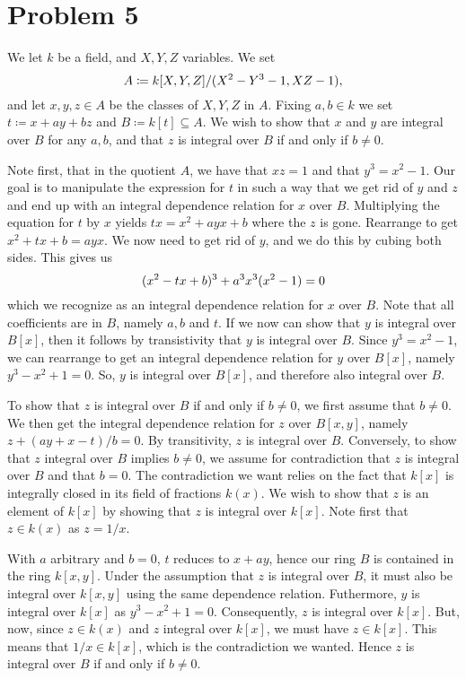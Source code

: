 \documentclass{article}
\begin{document}
\section*{Problem 5}
We let $k$ be a field, and $X, Y, Z$ variables. We set
\begin{equation}
    \notag
    A \coloneqq k[X, Y, Z] / (X^2- Y^3 - 1, XZ - 1), 
\end{equation}
and let $x, y, z \in A$ be the classes of $X, Y, Z$ in $A$. Fixing $a, b \in k$
we set $t \coloneqq x + ay + bz$ and $B \coloneqq k[t] \subseteq A$. We wish to
show that $x$ and $y$ are integral over $B$ for any $a, b$, and that $z$ is
integral over $B$ if and only if $b \neq 0$.

Note first, that in the quotient $A$, we have that $xz = 1$ and that $y^3 = x^2
- 1$. Our goal is to manipulate the expression for $t$ in such a way that we
get rid of $y$ and $z$ and end up with an integral dependence relation for $x$
over $B$. Multiplying the equation for $t$ by $x$ yields $tx = x^2 + ayx + b$
where the $z$ is gone. Rearrange to get $x^2 + tx + b = ayx$. We now need to
get rid of $y$, and we do this by cubing both sides. This gives us
\begin{equation}
    \notag
    (x^2 - tx + b)^3 + a^3x^3(x^2 - 1) = 0
\end{equation}
which we recognize as an integral dependence relation for $x$ over $B$. Note
that all coefficients are in $B$, namely $a, b$ and $t$. If we now can show
that $y$ is integral over $B[x]$, then it follows by transistivity that $y$ is
integral over $B$. Since $y^3 = x^2 - 1$, we can rearrange to get an integral
dependence relation for $y$ over $B[x]$, namely $y^3 - x^2 + 1 = 0$. So, $y$ is
integral over $B[x]$, and therefore also integral over $B$.

To show that $z$ is integral over $B$ if and only if $b \neq 0$, we first
assume that $b\neq 0$. We then get the integral dependence relation for $z$
over $B[x, y]$, namely $z + (a y + x - t) / b = 0$. By transitivity, $z$ is
integral over $B$. Conversely, to show that $z$ integral over $B$ implies $b
\neq 0$, we assume for contradiction that $z$ is integral over $B$ and that $b
= 0$. The contradiction we want relies on the fact that $k[x]$ is integrally
closed in its field of fractions $k(x)$. We wish to show that $z$ is an element
of $k[x]$ by showing that $z$ is integral over $k[x]$. Note first that $z \in
k(x)$ as $z = 1 / x$. 

With $a$ arbitrary and $b = 0$, $t$ reduces to $x + ay$, hence our ring $B$ is
contained in the ring $k[x, y]$. Under the assumption that $z$ is integral over
$B$, it must also be integral over $k[x, y]$ using the same dependence
relation. Futhermore, $y$ is integral over $k[x]$ as $y^3 - x^2 + 1 = 0$.
Consequently, $z$ is integral over $k[x]$. But, now, since $z \in k(x)$ and $z$
integral over $k[x]$, we must have $z \in k[x]$. This means that $1 / x \in
k[x]$, which is the contradiction we wanted. Hence $z$ is integral over $B$ if
and only if $b \neq 0$.
 
\end{document}
